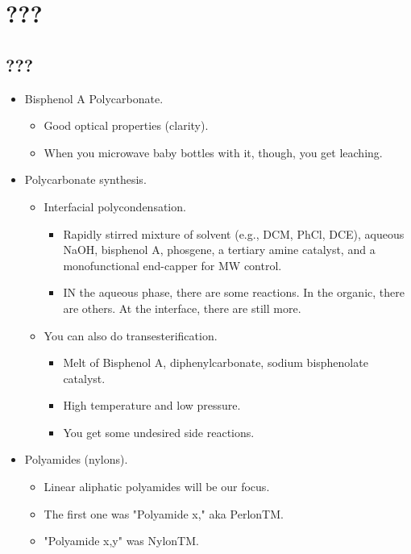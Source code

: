 \documentclass[../notes.tex]{subfiles}
\begin{document}
\chapter{???}
\section{???}
\begin{itemize}
    \item {}Bisphenol A Polycarbonate.
    \begin{itemize}
        \item Good optical properties (clarity).
        \item When you microwave baby bottles with it, though, you get leaching.
    \end{itemize}
    \item Polycarbonate synthesis.
    \begin{itemize}
        \item Interfacial polycondensation.
        \begin{itemize}
            \item Rapidly stirred mixture of solvent (e.g., DCM, PhCl, DCE), aqueous NaOH, bisphenol A, phosgene, a tertiary amine catalyst, and a monofunctional end-capper for MW control.
            \item IN the aqueous phase, there are some reactions. In the organic, there are others. At the interface, there are still more.
        \end{itemize}
        \item You can also do transesterification.
        \begin{itemize}
            \item Melt of Bisphenol A, diphenylcarbonate, sodium bisphenolate catalyst.
            \item High temperature and low pressure.
            \item You get some undesired side reactions.
        \end{itemize}
    \end{itemize}
    \item Polyamides (nylons).
    \begin{itemize}
        \item Linear aliphatic polyamides will be our focus.
        \item The first one was "Polyamide x," aka PerlonTM.
        \item "Polyamide x,y" was NylonTM.
    \end{itemize}

\end{itemize}
\end{document}
